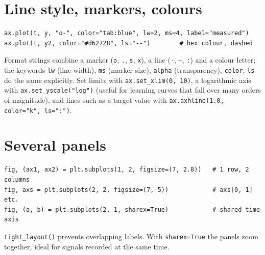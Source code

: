 \section*{Line style, markers, colours}
\begin{verbatim}
ax.plot(t, y, "o-", color="tab:blue", lw=2, ms=4, label="measured")
ax.plot(t, y2, color="#d62728", ls="--")        # hex colour, dashed
\end{verbatim}
Format strings combine a marker (\texttt{o}, \texttt{.}, \texttt{s}, \texttt{x}), a line (\texttt{-}, \texttt{--}, \texttt{:}) and a colour letter; the keywords \texttt{lw} (line width), \texttt{ms} (marker size), \texttt{alpha} (transparency), \texttt{color}, \texttt{ls} do the same explicitly. Set limits with \texttt{ax.set\_xlim(0, 10)}, a logarithmic axis with \texttt{ax.set\_yscale("log")} (useful for learning curves that fall over many orders of magnitude), and lines such as a target value with \verb!ax.axhline(1.0, color="k", ls=":")!.

\section*{Several panels}
\begin{verbatim}
fig, (ax1, ax2) = plt.subplots(1, 2, figsize=(7, 2.8))   # 1 row, 2 columns
fig, axs = plt.subplots(2, 2, figsize=(7, 5))            # axs[0, 1] etc.
fig, (a, b) = plt.subplots(2, 1, sharex=True)            # shared time axis
\end{verbatim}
\texttt{tight\_layout()} prevents overlapping labels. With \texttt{sharex=True} the panels zoom together, ideal for signals recorded at the same time.

